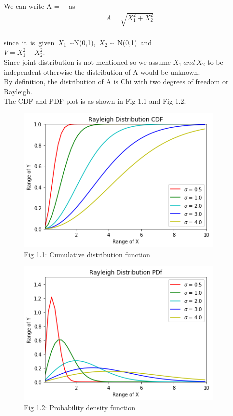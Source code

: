 \documentclass[journal,12pt,twocolumn]{IEEEtran}
\begin{document}
\subsection*{}\\
We can write A = \ \ as\\

\begin{align}A = \sqrt{X_1^2 + X_2^2}\end{align}\\

since\ it\ is\ given\ $X_1$\ \sim N(0,1),\ $X_2$ \sim\ N(0,1)\ and\ \\
$V = X_1^2 + X_2^2$.\\

Since joint distribution is not mentioned so we assume $X_1\ and\ X_2$ to be independent otherwise the distribution of A would be unknown.\\

By definition, the distribution of A is Chi with two degrees of freedom or Rayleigh.\\

The CDF and PDF plot is as shown in Fig 1.1 and Fig 1.2.

\begin{figure}[h!]
    \centering
    \includegraphics[width=10cm]{Assignment-1/Codes/Figures/CDF.png}
    \caption*{Fig 1.1: Cumulative distribution function}
\end{figure}

\begin{figure}[h!]
    \centering
    \includegraphics[width=10cm]{Assignment-1/Codes/Figures/PDf.png}
    \caption*{Fig 1.2: Probability density function}
\end{figure}
\end{document}
